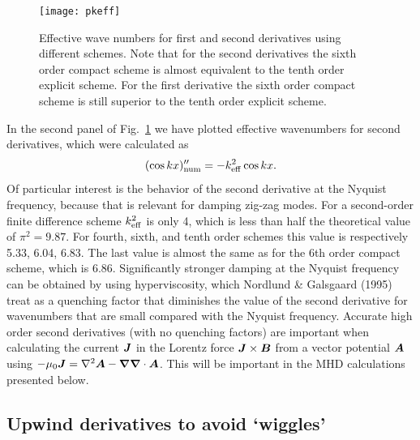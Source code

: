 \documentclass[\mydriver,12pt,twoside,notitlepage,a4paper]{article}
\renewcommand{\vec}[1]{\mbox{\boldmath{$#1$}}}
\newcommand{\Av}            {\vec{A}}
\newcommand{\Bv}            {\vec{B}}
\newcommand{\Jv}            {\vec{J}}
\newcommand{\nab}{\mbox{\boldmath $\nabla$} {}}
\begin{document}
\begin{figure}[h!]\begin{center}\texttt{[image: pkeff]}\end{center}\caption[]{
Effective wave numbers for first and second derivatives using different
schemes. Note that for the second derivatives the sixth order compact
scheme is almost equivalent to the tenth order explicit scheme. For the
first derivative the sixth order compact scheme is still superior to the
tenth order explicit scheme.
}\label{Fpkeff}\end{figure}

In the second panel of Fig.~\ref{Fpkeff} we have plotted effective
wavenumbers for second derivatives, which were calculated as
\begin{equation}
(\cos kx)''_{\rm num}=-k_{\rm eff}^2\cos kx.
\end{equation}
Of particular interest is the behavior of the second derivative at the
Nyquist frequency, because that is relevant for damping zig-zag modes.
For a second-order finite difference scheme $k_{\rm eff}^2$ is only 4,
which is less than half the theoretical value of $\pi^2=9.87$. For fourth,
sixth, and tenth order schemes this value is respectively 5.33, 6.04,
6.83. The last value is almost the same as for the 6th order compact
scheme, which is 6.86. Significantly stronger damping at the Nyquist
frequency can be obtained by using hyperviscosity, which Nordlund \&
Galsgaard (1995) treat as a quenching factor that diminishes the value
of the second derivative for wavenumbers that are small compared with
the Nyquist frequency. Accurate high order second derivatives (with no
quenching factors) are important when calculating the current $\Jv$ in
the Lorentz force $\Jv\times\Bv$ from a vector potential $\Av$ using
$-\mu_0\Jv=\nabla^2\Av-\nab\nab\cdot\Av$. This will be important in
the MHD calculations presented below. 


\subsection{Upwind derivatives to avoid `wiggles'}
\label{S-upwind}
\newcommand{\Order}[1]{O\left(#1\right)}
\end{document}
